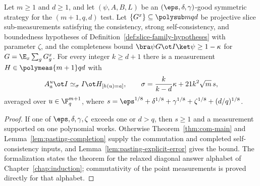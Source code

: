 \begin{theorem}\label{thm:ld-pasting}
	\leanok
	Let $m\ge1$ and $d\ge1$, and let $(\psi,A,B,L)$ be an
	$(\eps,\delta,\gamma)$-good symmetric strategy for the $(m+1,q,d)$ test.
	Let $\{G^x\}\subseteq\polysub mqd$ be projective slice sub-measurements
	satisfying the consistency, strong self-consistency, and boundedness
	hypotheses of Definition~\ref{def:slice-family-hypotheses} with
	parameter $\zeta$, and the completeness bound
	$\bra\psi G\ot I\ket\psi\ge1-\kappa$ for $G=\E_x\sum_gG^x_g$.  For every
	integer $k\ge d+1$ there is a measurement $H\in\polymeas{m+1}qd$ with
	\[
		A^u_a\ot I\simeq_\sigma I\ot H_{[h(u)=a]},\qquad
		\sigma=\frac{k}{k-d}\kappa+21k^2\sqrt m\,s,
	\]
	averaged over $u\in\F_q^{m+1}$, where
	$s=\eps^{1/8}+\delta^{1/8}+\gamma^{1/8}+\zeta^{1/8}+(d/q)^{1/8}$.
\end{theorem}
\begin{proof}
	\leanok
	If one of $\eps,\delta,\gamma,\zeta$ exceeds one or $d>q$, then $s\ge1$
	and a measurement supported on one polynomial works.  Otherwise
	Theorem~\ref{thm:com-main} and Lemma~\ref{lem:pasting-completion} supply
	the commutation and completed self-consistency inputs, and
	Lemma~\ref{lem:pasting-explicit-error} gives the bound.  The formalization
	states the theorem for the relaxed diagonal answer alphabet of
	Chapter~\ref{chap:induction}; commutativity of the point measurements is
	proved directly for that alphabet.
\end{proof}
